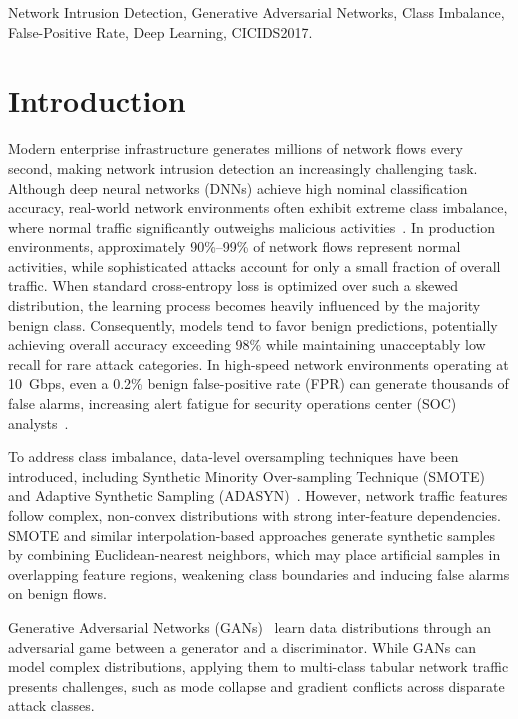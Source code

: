 \documentclass[conference]{IEEEtran}
\begin{document}
\begin{IEEEkeywords}
Network Intrusion Detection, Generative Adversarial Networks, Class Imbalance, False-Positive Rate, Deep Learning, CICIDS2017.
\end{IEEEkeywords}

\section{Introduction}

Modern enterprise infrastructure generates millions of network flows every second, making network intrusion detection an increasingly challenging task. Although deep neural networks (DNNs) achieve high nominal classification accuracy, real-world network environments often exhibit extreme class imbalance, where normal traffic significantly outweighs malicious activities~\cite{sharafaldin2018toward}. In production environments, approximately 90\%--99\% of network flows represent normal activities, while sophisticated attacks account for only a small fraction of overall traffic. When standard cross-entropy loss is optimized over such a skewed distribution, the learning process becomes heavily influenced by the majority benign class. Consequently, models tend to favor benign predictions, potentially achieving overall accuracy exceeding 98\% while maintaining unacceptably low recall for rare attack categories. In high-speed network environments operating at 10~Gbps, even a 0.2\% benign false-positive rate (FPR) can generate thousands of false alarms, increasing alert fatigue for security operations center (SOC) analysts~\cite{sommer2010outside}.

To address class imbalance, data-level oversampling techniques have been introduced, including Synthetic Minority Over-sampling Technique (SMOTE)~\cite{chawla2002smote} and Adaptive Synthetic Sampling (ADASYN)~\cite{he2008adasyn}. However, network traffic features follow complex, non-convex distributions with strong inter-feature dependencies. SMOTE and similar interpolation-based approaches generate synthetic samples by combining Euclidean-nearest neighbors, which may place artificial samples in overlapping feature regions, weakening class boundaries and inducing false alarms on benign flows.

Generative Adversarial Networks (GANs)~\cite{goodfellow2014gan} learn data distributions through an adversarial game between a generator and a discriminator. While GANs can model complex distributions, applying them to multi-class tabular network traffic presents challenges, such as mode collapse and gradient conflicts across disparate attack classes.
\end{document}
